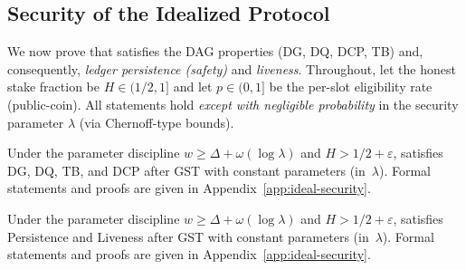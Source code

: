\subsection{Security of the Idealized Protocol}
\label{subsec:ideal-security}
We now prove that \ProjIdeal satisfies the DAG properties (DG, DQ, DCP, TB) and, consequently, \emph{ledger persistence (safety)} and \emph{liveness}. Throughout, let the honest stake fraction be $H\in(1/2,1]$ and let $p\in(0,1]$ be the per-slot eligibility rate (public-coin). All statements hold \emph{except with negligible probability} in the security parameter $\lambda$ (via Chernoff-type bounds).



\begin{theorem}\label{thm:ideal-consensus-summary}
Under the parameter discipline $w \ge \Delta + \omega(\log \lambda)$ and $H>1/2+\varepsilon$,
\ProjIdeal{} satisfies DG, DQ, TB, and DCP after GST with constant parameters (in~$\lambda$).
Formal statements and proofs are given in Appendix~\ref{app:ideal-security}.
\end{theorem}


\begin{theorem}\label{thm:ideal-ledger-summary}
Under the parameter discipline $w \ge \Delta + \omega(\log \lambda)$ and $H>1/2+\varepsilon$,
\ProjIdeal{} satisfies Persistence and Liveness after GST with constant parameters (in~$\lambda$).
Formal statements and proofs are given in Appendix~\ref{app:ideal-security}.
\end{theorem}




